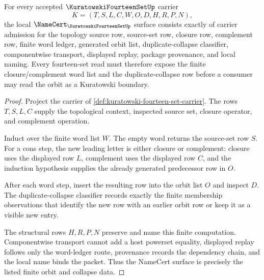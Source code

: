 \begin{theorem}
\label{thm:kuratowski-fourteen-set-namecert-obligations}
For every accepted $\KuratowskiFourteenSetUp$ carrier
$$
K=(T,S,L,C,W,O,D,H,R,P,N),
$$
the local $\NameCert_{\KuratowskiFourteenSetUp}$ surface consists exactly of carrier admission for the topology source row, source-set row, closure row, complement row, finite word ledger, generated orbit list, duplicate-collapse classifier, componentwise transport, displayed replay, package provenance, and local naming. Every fourteen-set read must therefore expose the finite closure/complement word list and the duplicate-collapse row before a consumer may read the orbit as a Kuratowski boundary.
\end{theorem}
\begin{proof}
Project the carrier of \autoref{def:kuratowski-fourteen-set-carrier}. The rows $T,S,L,C$ supply the topological context, inspected source set, closure operator, and complement operation.

Induct over the finite word list $W$. The empty word returns the source-set row $S$. For a cons step, the new leading letter is either closure or complement: closure uses the displayed row $L$, complement uses the displayed row $C$, and the induction hypothesis supplies the already generated predecessor row in $O$.

After each word step, insert the resulting row into the orbit list $O$ and inspect $D$. The duplicate-collapse classifier records exactly the finite membership observations that identify the new row with an earlier orbit row or keep it as a visible new entry.

The structural rows $H,R,P,N$ preserve and name this finite computation. Componentwise transport cannot add a host powerset equality, displayed replay follows only the word-ledger route, provenance records the dependency chain, and the local name binds the packet. Thus the NameCert surface is precisely the listed finite orbit and collapse data.
\end{proof}



